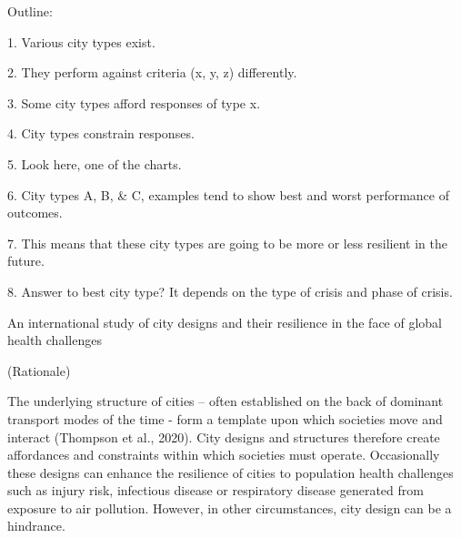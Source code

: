\documentclass[preprint,12pt]{elsarticle}
\begin{document}
\begin{frontmatter}





\end{frontmatter}




Outline:

1. Various city types exist.

2. They perform against criteria (x, y, z) differently.

3. Some city types afford responses of type x.

4. City types constrain responses.

5. Look here, one of the charts.

6. City types A, B, \& C, examples tend to show best and worst performance of outcomes.

7. This means that these city types are going to be more or less resilient in the future. 

8. Answer to best city type?
	It depends on the type of crisis and phase of crisis.
	
	


An international study of city designs and their resilience in the face of global health challenges

(Rationale)

The underlying structure of cities – often established on the back of dominant transport modes of the time - form a template upon which societies move and interact (Thompson et al., 2020). City designs and structures therefore create affordances and constraints within which societies must operate. Occasionally these designs can enhance the resilience of cities to population health challenges such as injury risk, infectious disease or respiratory disease generated from exposure to air pollution. However, in other circumstances, city design can be a hindrance.
\end{document}
